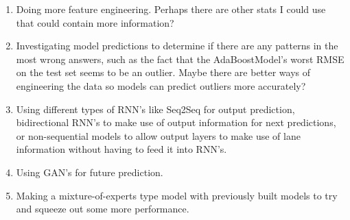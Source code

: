 \documentclass{article}
\begin{document}
\begin{enumerate}
    \item Doing more feature engineering. Perhaps there are other stats I could use that could contain more information?
    \item Investigating model predictions to determine if there are any patterns in the most wrong answers, such as the fact that the AdaBoostModel's worst RMSE on the test set seems to be an outlier. Maybe there are better ways of engineering the data so models can predict outliers more accurately?
    \item Using different types of RNN's like Seq2Seq for output prediction, bidirectional RNN's to make use of output information for next predictions, or non-sequential models to allow output layers to make use of lane information without having to feed it into RNN's.
    \item Using GAN's for future prediction.
    \item Making a mixture-of-experts type model with previously built models to try and squeeze out some more performance.
\end{enumerate}


\newpage
\end{document}
